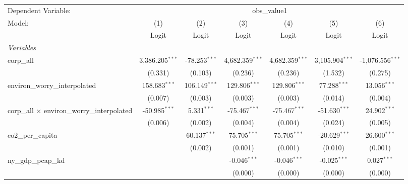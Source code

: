 
\begingroup
\centering
\begin{tabular}{lcccccc}
   \toprule
   Dependent Variable: & \multicolumn{6}{c}{obs\_value1}\\
   Model:                                              & (1)               & (2)             & (3)               & (4)               & (5)               & (6)\\  
                                                       &  Logit            & Logit           & Logit             & Logit             & Logit             & Logit\\  
   \midrule
   \emph{Variables}\\
   corp\_all                                           & 3,386.205$^{***}$ & -78.253$^{***}$ & 4,682.359$^{***}$ & 4,682.359$^{***}$ & 3,105.904$^{***}$ & -1,076.556$^{***}$\\   
                                                       & (0.331)           & (0.103)         & (0.236)           & (0.236)           & (1.532)           & (0.275)\\   
   environ\_worry\_interpolated                        & 158.683$^{***}$   & 106.149$^{***}$ & 129.806$^{***}$   & 129.806$^{***}$   & 77.288$^{***}$    & 13.056$^{***}$\\   
                                                       & (0.007)           & (0.003)         & (0.003)           & (0.003)           & (0.014)           & (0.004)\\   
   corp\_all $\times$ environ\_worry\_interpolated     & -50.985$^{***}$   & 5.331$^{***}$   & -75.467$^{***}$   & -75.467$^{***}$   & -51.630$^{***}$   & 24.902$^{***}$\\   
                                                       & (0.006)           & (0.002)         & (0.004)           & (0.004)           & (0.024)           & (0.005)\\   
   co2\_per\_capita                                    &                   & 60.137$^{***}$  & 75.705$^{***}$    & 75.705$^{***}$    & -20.629$^{***}$   & 26.600$^{***}$\\   
                                                       &                   & (0.002)         & (0.001)           & (0.001)           & (0.010)           & (0.001)\\   
   ny\_gdp\_pcap\_kd                                   &                   &                 & -0.046$^{***}$    & -0.046$^{***}$    & -0.025$^{***}$    & 0.027$^{***}$\\   
                                                       &                   &                 & (0.000)           & (0.000)           & (0.000)           & (0.000)\\   

\end{tabular}
